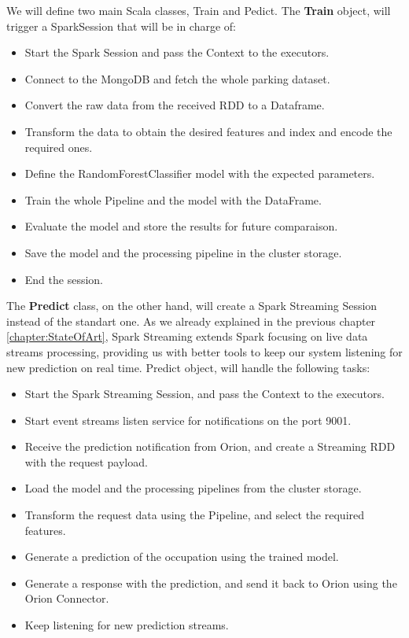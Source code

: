 We will define two main Scala classes, Train and Pedict. The \textbf{Train} object, will trigger a SparkSession that will be in charge of:
\begin{itemize}
    \item Start the Spark Session and pass the Context to the executors.
    \item Connect to the MongoDB and fetch the whole parking dataset.
    \item Convert the raw data from the received RDD to a Dataframe.
    \item Transform the data to obtain the desired features and index and encode the required ones.
    \item Define the RandomForestClassifier model with the expected parameters.
    \item Train the whole Pipeline and the model with the DataFrame.
    \item Evaluate the model and store the results for future comparaison.
    \item Save the model and the processing pipeline in the cluster storage.
    \item End the session.
\end{itemize}

The \textbf{Predict} class, on the other hand, will create a Spark Streaming Session instead of the standart one. As we already explained in the previous chapter \ref{chapter:StateOfArt}, Spark Streaming extends Spark focusing on live data streams processing, providing us with better tools to keep our system listening for new prediction on real time. Predict object, will handle the following tasks:

\begin{itemize}
    \item Start the Spark Streaming Session, and pass the Context to the executors.
    \item Start event streams listen service for notifications on the port 9001.
    \item Receive the prediction notification from Orion, and create a Streaming RDD with the request payload.
    \item Load the model and the processing pipelines from the cluster storage.
    \item Transform the request data using the Pipeline, and select the required features.
    \item Generate a prediction of the occupation using the trained model.
    \item Generate a response with the prediction, and send it back to Orion using the Orion Connector.
    \item Keep listening for new prediction streams.
\end{itemize}

